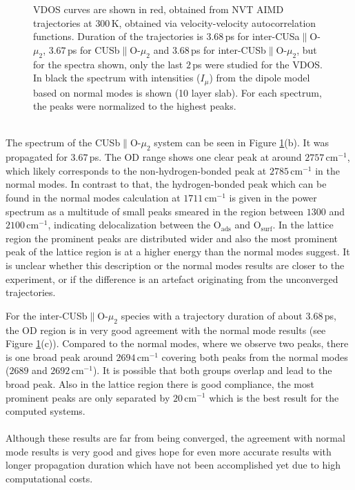 \documentclass[11pt,DIV=13,BCOR=5mm,a4paper,headinclude]{scrbook}
\begin{document}
\begin{figure}[!h]
             \caption{VDOS curves are shown in red, obtained from NVT AIMD trajectories at $300\,$K, obtained via velocity-velocity autocorrelation functions.
Duration of the trajectories is $3.68\,$ps for inter-CUSa$\parallel$O-$\mu_2$, $3.67\,$ps for CUSb$\parallel$O-$\mu_2$ and $3.68\,$ps for inter-CUSb$\parallel$O-$\mu_2$, but for the spectra shown, only the last $2\,$ps were studied for the VDOS.
In black the spectrum with intensities ($I_\mu$) from the dipole model based on normal modes is shown (10 layer slab).
For each spectrum, the peaks were normalized to the highest peaks.}
            \label{abb:velvel_ads_spec}
\end{figure}
\\

The spectrum of the CUSb$\parallel$O-$\mu_2$ system can be seen in Figure \ref{abb:velvel_ads_spec}(b).
It was propagated for $3.67\,$ps.
The OD range shows one clear peak at around $2757\,$cm$^{-1}$, which likely corresponds to the non-hydrogen-bonded peak at $2785\,$cm$^{-1}$ in the normal modes.
In contrast to that, the hydrogen-bonded peak which can be found in the normal modes calculation at $1711\,$cm$^{-1}$ is given in the power spectrum as a multitude of small peaks smeared in the region between $1300$ and $2100\,$cm$^{-1}$, indicating delocalization between the O$_\textrm{ads}$ and O$_\textrm{surf}$.
In the lattice region the prominent peaks are distributed wider and also the most prominent peak of the lattice region is at a higher energy than the normal modes suggest.
It is unclear whether this description or the normal modes results are closer to the experiment, or if the difference is an artefact originating from the unconverged trajectories.


For the inter-CUSb$\parallel$O-$\mu_2$ species with a trajectory duration of about $3.68\,$ps, the OD region is in very good agreement with the normal mode results (see Figure \ref{abb:velvel_ads_spec}(c)).
Compared to the normal modes, where we observe two peaks, there is one broad peak around $2694\,$cm$^{-1}$ covering both peaks from the normal modes ($2689$ and $2692\,$cm$^{-1}$).
It is possible that both groups overlap and lead to the broad peak.
Also in the lattice region there is good compliance, the most prominent peaks are only separated by $20\,$cm$^{-1}$ which is the best result for the computed systems.
\\
\\

Although these results are far from being converged, the agreement with normal mode results is very good and gives hope for even more accurate results with longer propagation duration which have not been accomplished yet due to high computational costs.
\end{document}
